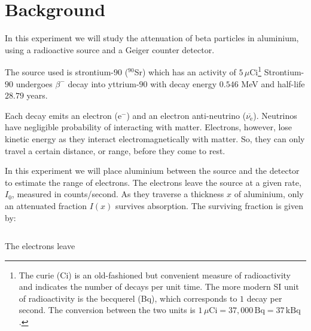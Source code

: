 \section{Background}%

In this experiment we will study the attenuation of beta particles in aluminium, using a radioactive source and a Geiger counter detector. 

The source used is strontium-$90$ ($^{90}$Sr) which has an activity of $5\,\mu$Ci\footnote{The curie (Ci) is an old-fashioned but convenient measure of radioactivity and indicates the number of decays per unit time. The more modern SI unit of radioactivity is the becquerel (Bq), which corresponds to $1$ decay per second. The conversion between the two units is $1\,\mu\textrm{Ci} = 37,000\,\textrm{Bq} = 37\,\textrm{kBq}$.} Strontium-$90$ undergoes $\beta^{-}$ decay into yttrium-$90$ with decay energy $0.546$ MeV and half-life $28.79$ years. 

Each decay emits an electron ($\mathrm{e}^-$)  and an electron anti-neutrino ($\overbar{\nu_\mathrm{e}}$). Neutrinos have negligible probability of interacting with matter. Electrons, however, lose kinetic energy as they interact electromagnetically with matter. So, they can only travel a certain distance, or range, before they come to rest.

In this experiment we will place aluminium between the source and the detector to estimate the range
of electrons.  The electrons leave the source at a given rate, $I_0$, measured in counts/second. As they traverse a thickness $x$ of aluminium, only an attenuated fraction $I(x)$ survives absorption. The surviving fraction is given by:

\begin{displaymath}

\end{displaymath}

The electrons leave 

